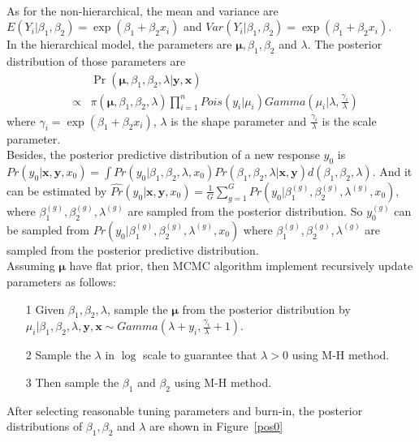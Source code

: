 \documentclass[]{article}
\begin{document}
\begin{enumerate}
{\begin{itemize}
\begin{eqnarray}
			\end{eqnarray}
			As for the non-hierarchical, the mean and variance are $E(Y_i|\beta_1,\beta_2) = \exp(\beta_1  + \beta_2x_i)$ and $Var(Y_i|\beta_1,\beta_2) = \exp(\beta_1  + \beta_2x_i)$.\\
			In the hierarchical model, the parameters are $\bm \mu, \beta_1, \beta_2$ and $\lambda$. The posterior distribution of those parameters are 
			\begin{eqnarray}
			& & \Pr(\bm\mu, \beta_1, \beta_2,\lambda|\bm y, \bm x)\\ & \propto & \pi(\bm\mu,\beta_1, \beta_2, \lambda)\prod_{i = 1}^{n}Pois(y_i|\mu_i)Gamma(\mu_i|\lambda,\frac{\gamma_i}{\lambda})
			\end{eqnarray}
			where $\gamma_i = \exp(\beta_1+\beta_2x_i)$, $\lambda$ is the shape parameter and $\frac{\gamma_i}{\lambda}$ is the scale parameter.\\
			Besides, the posterior predictive distribution of a new response $y_0$ is $Pr(y_0|\bm x,\bm y, x_0) = \int Pr(y_0|\beta_1, \beta_2, \lambda, x_0)Pr(\beta_1, \beta_2,\lambda|\bm x, \bm y) d(\beta_1, \beta_2, \lambda)$. And it can be estimated  by $\hat{Pr}(y_0|\bm x,\bm y, x_0) = \frac{1}{G}\sum_{g = 1}^{G}Pr(y_0|\beta_1^{(g)}, \beta_2^{(g)},\lambda^{(g)}, x_0)$, where $\beta_1^{(g)}, \beta_2^{(g)},\lambda^{(g)}$ are sampled from the posterior distribution. So $y_0^{(g)}$ can be sampled from $Pr(y_0|\beta_1^{(g)}, \beta_2^{(g)},\lambda^{(g)}, x_0)$ where $\beta_1^{(g)}, \beta_2^{(g)},\lambda^{(g)}$ are sampled from the posterior predictive distribution.\\
			Assuming $\bm{\mu}$ have flat prior, then MCMC algorithm implement recursively update parameters as follows:\\
			\begin{itemize}
				\item[1] Given $\beta_1, \beta_2,\lambda$, sample the $\bm{\mu}$ from the posterior distribution by $\mu_i|\beta_1, \beta_2,\lambda, \bm y,\bm x \sim Gamma(\lambda+y_i,\frac{\gamma_i}{\lambda}+1)$.
				\item[2] Sample  the $\lambda$ in $\log$ scale to guarantee that $\lambda > 0$ using M-H method.
				\item[3] Then sample the $\beta_1$ and $\beta_2$ using M-H method.
			\end{itemize} 
			After selecting reasonable tuning parameters and burn-in, the posterior distributions of $\beta_1, \beta_2$ and $\lambda$ are shown in Figure~\ref{pos0}
			\begin{figure}[ht!]

\end{figure}
\end{itemize}}
\end{enumerate}
\end{document}
